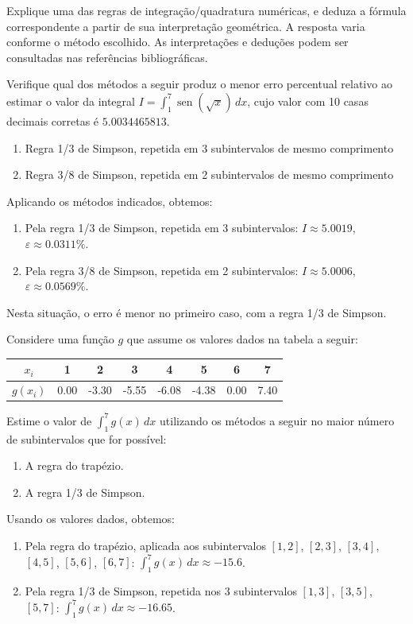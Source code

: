 \documentclass[12pt,a4paper]{article}
\newcommand*\sen{\operatorname{sen}}
\begin{document}
\begin{ExerciseList}
\Exercise[title={2,5}] Explique uma das regras de integração/quadratura numéricas, e deduza a fórmula correspondente a partir de sua interpretação geométrica.
\Answer A resposta varia conforme o método escolhido. As interpretações e deduções podem ser consultadas nas referências bibliográficas.

\Exercise[title={2,5}] Verifique qual dos métodos a seguir produz o menor erro percentual relativo ao estimar o valor da integral $I = \int_1^7 \sen\left(\sqrt{x}\right)\, dx$, cujo valor com 10 casas decimais corretas é $5.0034465813$.
\begin{enumerate}
\item Regra 1/3 de Simpson, repetida em 3 subintervalos de mesmo comprimento
\item Regra 3/8 de Simpson, repetida em 2 subintervalos de mesmo comprimento
\end{enumerate}
\Answer Aplicando os métodos indicados, obtemos:
\begin{enumerate}
\item Pela regra 1/3 de Simpson, repetida em 3 subintervalos: $I \approx 5.0019$, $\varepsilon \approx 0.0311 \%$.
\item Pela regra 3/8 de Simpson, repetida em 2 subintervalos: $I \approx 5.0006$, $\varepsilon \approx 0.0569 \%$.
\end{enumerate}
Nesta situação, o erro é menor no primeiro caso, com a regra 1/3 de Simpson.

\Exercise[title={2,5}] Considere uma função $g$ que assume os valores dados na tabela a seguir:
\begin{center}
\begin{tabular}{|c|c|c|c|c|c|c|c|}
\hline
   $x_i$ & 1 & 2 & 3 & 4 & 5 & 6 & 7 \\ \hline
$g(x_i)$ & 0.00 & -3.30 & -5.55 & -6.08 & -4.38 & 0.00 & 7.40 \\ \hline
\end{tabular}
\end{center}
Estime o valor de $\int_1^7 g(x)\,dx$ utilizando os métodos a seguir no maior número de subintervalos que for possível:
\begin{multicols}{2}
\begin{enumerate}
\item A regra do trapézio.
\item A regra 1/3 de Simpson.
\end{enumerate}
\end{multicols}
\Answer Usando os valores dados, obtemos:
\begin{enumerate}
\item Pela regra do trapézio, aplicada aos subintervalos $[1,2]$, $[2,3]$, $[3,4]$, $[4,5]$, $[5,6]$, $[6,7]$: $\int_1^7 g(x)\,dx \approx-15.6$.
\item Pela regra 1/3 de Simpson, repetida nos 3 subintervalos $[1,3]$, $[3,5]$, $[5,7]$: $\int_1^7 g(x)\,dx \approx -16.65$.
\end{enumerate}


\end{ExerciseList}
\end{document}
